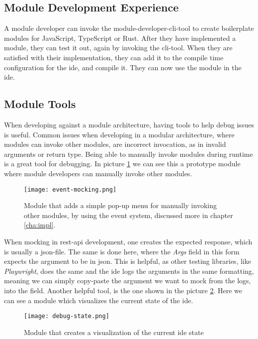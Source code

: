 \subsection{Module Development Experience}

A module developer can invoke the module-developer-\gls*{cli}-tool to create
boilerplate modules for JavaScript, TypeScript or Rust. After they have
implemented a module, they can test it out, again by invoking the
\gls*{cli}-tool. When they are satisfied with their implementation, they can add
it to the compile time configuration for the \gls*{ide}, and compile it. They
can now use the module in the \gls*{ide}.

\subsection{Module Tools}

When developing against a module architecture, having tools to help debug issues
is useful. Common issues when developing in a modular architecture, where
modules can invoke other modules, are incorrect invocation, as in invalid
arguments or return type. Being able to manually invoke modules during runtime
is a great tool for debugging. In picture \ref{pic:eventMock} we can see this a
prototype module where module developers can manually invoke other modules.

\begin{figure}[H]
  \centering
  \texttt{[image: event-mocking.png]}
  \caption{
    Module that adds a simple pop-up menu for manually invoking other modules,
    by using the event system, discussed more in chapter \ref{cha:impl}.
  }
  \label{pic:eventMock}
\end{figure}

When mocking in \gls*{rest}-\gls*{api} development, one creates the expected
response, which is usually a \gls*{json}-file. The same is done here, where the
\textit{Args} field in this form expects the argument to be in \gls*{json}. This
is helpful, as other testing libraries, like \textit{Playwright}, does the same
and the \gls*{ide} logs the arguments in the same formatting, meaning we
can simply copy-paste the argument we want to mock from the logs, into the
field. Another helpful tool, is the one shown in the picture
\ref{pic:debugState}. Here we can see a module which visualizes the current
state of the \gls*{ide}.

\begin{figure}[H]
  \centering
  \texttt{[image: debug-state.png]}
  \caption{
    Module that creates a visualization of the current \gls*{ide} state
  }
  \label{pic:debugState}
\end{figure}


